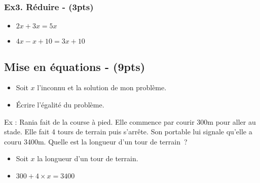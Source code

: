 \subsubsection*{Ex3. Réduire - (3pts)}

\begin{itemize}[label={$\bullet$}]
  \item  $2x + 3x = 5x$
  \item  $4x - x + 10 = 3x + 10$
\end{itemize}

\subsection*{Mise en équations - (9pts)}

\begin{itemize}[label={$\bullet$}]
  \item  Soit $x$ l’inconnu et la solution de mon problème.
  \item  Écrire l’égalité du problème.
\end{itemize}

Ex : Rania fait de la course à pied. Elle commence par courir 300m pour aller au stade. Elle fait 4 tours de terrain puis s’arrête. Son portable lui signale qu’elle a couru 3400m. Quelle est la longueur d’un tour de terrain ?

\begin{itemize}[label={$\bullet$}]
  \item  Soit $x$ la longueur d’un tour de terrain.
  \item  $300 + 4 \times x = 3400$
\end{itemize}

